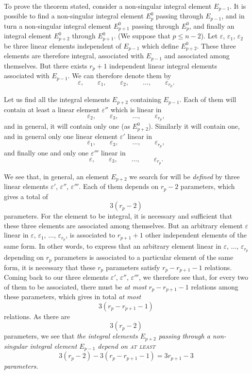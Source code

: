 \documentclass[leqno,11pt]{book}
\makeatletter
\theoremstyle{shape1}
\theoremstyle{shapesmall}
\let\old@epsilon\epsilon
\let\old@varepsilon\varepsilon
\let\epsilon\old@varepsilon
\let\varepsilon\old@epsilon
\makeatother
\begin{document}
To prove the theorem stated, consider a non-singular integral element $E_{p-1}$. It is possible to find a non-singular integral element $E_{p}^{0}$ passing through $E_{p-1}$, and in turn a non-singular integral element $E_{p+1}^{0}$ passing through $E_{p}^{0}$, and finally an integral element $E_{p+2}^{0}$ through $E_{p+1}^{0}$. (We suppose that $p\le n-2$). Let $\epsilon$, $\epsilon_{1}$, $\epsilon_{2}$ be three linear elements independent of $E_{p-1}$ which define $E_{p+2}^{0}$. These three elements are therefore integral, associated with $E_{p-1}$ and associated among themselves. But there exists $r_{p}+1$ independent linear integral elements associated with $E_{p-1}$. We can therefore denote them by
\[
\epsilon,\qquad\epsilon_{1},\qquad\epsilon_{2},\qquad\dots,\qquad\epsilon_{r_{p}}.
\]

Let us find all the integral elements $E_{p+2}$ containing $E_{p-1}$. Each of them will contain at least a linear element $\epsilon''$ which is linear in
\[
\epsilon_{2},\qquad\epsilon_{3},\qquad\dots,\qquad\epsilon_{r_{p}},
\]
and in general, it will contain only one (as $E_{p+2}^{0}$). Similarly it will contain one, and in general only one linear element $\epsilon'$ linear in
\[
\epsilon_{1},\qquad\epsilon_{3},\qquad\dots,\qquad\epsilon_{r_{p}},
\]
and finally one and only one $\epsilon'''$ linear in
\[
\epsilon,\qquad\epsilon_{3},\qquad\dots,\qquad\epsilon_{r_{p}}.
\]

We see that, in general, an element $E_{p+2}$ we search for will be \emph{defined} by three linear elements $\epsilon'$, $\epsilon''$, $\epsilon'''$. Each of them depends on $r_{p}-2$ parameters, which gives a total of
\[
3(r_{p}-2)
\]
parameters. For the element to be integral, it is necessary and sufficient that these three elements are associated among themselves. But an arbitrary element $\epsilon$ linear in $\epsilon$, $\epsilon_{1}$, $\dots$, $\epsilon_{r_{p}}$, is associated to $r_{p+1}+1$ other independent elements of the same form. In other words, to express that an arbitrary element linear in $\epsilon$, $\dots$, $\epsilon_{r_{p}}$ depending on $r_{p}$ parameters is associated to a particular element of the same form, it is necessary that these $r_{p}$ parameters satisfy $r_{p}-r_{p+1}-1$ relations. Coming back to our three elements $\epsilon'$, $\epsilon''$, $\epsilon'''$, we therefore see that, for every two of them to be associated, there must be \emph{at most} $r_{p}-r_{p+1}-1$ relations among these parameters, which gives in total \emph{at most}
\[
3(r_{p}-r_{p+1}-1)
\]
relations. As there are
\[
3(r_{p}-2)
\]
parameters, we see that  \emph{the integral elements $E_{p+2}$ passing through a non-singular integral element $E_{p-1}$ depend on \textsc{at least}}
\[
3(r_{p}-2)-3(r_{p}-r_{p+1}-1)=3r_{p+1}-3
\]
\emph{parameters.}
\end{document}
